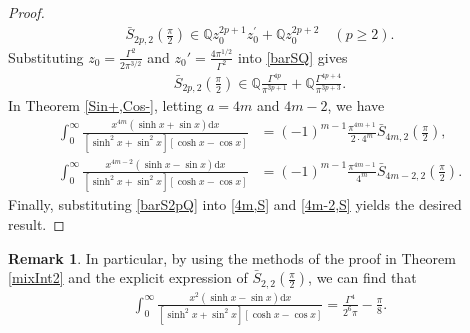 \documentclass[11pt]{article}
\theoremstyle{plain}
\theoremstyle{definition}
\newtheorem{re}[thm]{Remark}
\begin{document}
\begin{proof}
\begin{align}
\bar{S}_{2p,2}\left( \frac{\pi}{2} \right) \in \mathbb{Q} z_{0}^{2p+1}z_{0}^{\prime}+\mathbb{Q} z_{0}^{2p+2}\quad (p\ge 2).
\end{align}
Substituting $z_0=\frac{\Gamma ^2}{2\pi ^{3/2}}$ and $z_0'=\frac{4\pi ^{1/2}}{\Gamma ^2}$ into \eqref{barSQ} gives
\begin{align} \label{barS2pQ}
		\bar{S}_{2p,2}\left( \frac{\pi}{2} \right) \in \mathbb{Q} \frac{\Gamma ^{4p}}{\pi ^{3p+1}}+\mathbb{Q} \frac{\Gamma ^{4p+4}}{\pi ^{3p+3}}.
	\end{align}
In Theorem \ref{Sin+,Cos-}, letting $a=4m$ and $4m-2$, we have
\begin{align}
\int_0^{\infty}{\frac{x^{4m}\left( \sinh x+\sin x \right) \mathrm{d}x}{\left[ \sinh ^2x+\sin ^2x \right] \left[ \cosh x-\cos x \right]}}&=\left( -1 \right) ^{m-1}\frac{\pi ^{4m+1}}{2\cdot 4^m}\bar{S}_{4m,2}\left( \frac{\pi}{2} \right) ,\label{4m,S}
\\
	\int_0^{\infty}{\frac{x^{4m-2}\left( \sinh x-\sin x \right) \mathrm{d}x}{\left[ \sinh ^2x+\sin ^2x \right] \left[ \cosh x-\cos x \right]}}&=\left( -1 \right) ^{m-1}\frac{\pi ^{4m-1}}{4^m}\bar{S}_{4m-2,2}\left( \frac{\pi}{2} \right) \label{4m-2,S}.
\end{align}
Finally, substituting \eqref{barS2pQ} into \eqref{4m,S} and \eqref{4m-2,S} yields the desired result.
\end{proof}
\begin{re}
In particular, by using the methods of the proof in Theorem \ref{mixInt2} and the explicit expression of $\bar{S}_{2,2}\left( \frac{\pi}{2} \right)$, we can find that
\begin{align}
	\int_0^{\infty}{\frac{x^2\left( \sinh x-\sin x \right) \mathrm{d}x}{\left[ \sinh ^2x+\sin ^2x \right] \left[ \cosh x-\cos x \right]}}=\frac{\Gamma ^4}{2^6\pi}-\frac{\pi}{8}.
\end{align}
\end{re}
\end{document}
